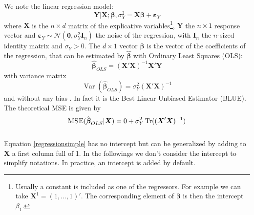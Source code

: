 \documentclass[12pt,a4paper]{report}
\begin{document}
We note the linear regression model:
\begin{equation}
		\boldsymbol{Y}|\boldsymbol{X};\boldsymbol{\beta},\sigma^2_Y=\boldsymbol{X}\boldsymbol{\beta} + \boldsymbol{\varepsilon}_Y \label{regressionsimple}
	\end{equation}
	where $\boldsymbol{X}$ is the $n\times d$ matrix of the explicative variables\footnote{Usually a constant is included as one of the regressors. For example we can take $\boldsymbol{X}^1=(1,\ldots,1)'$. The corresponding element of $\boldsymbol{\beta}$ is then the intercept $\beta_1$.},%
	 $\boldsymbol{Y}$ the  $n\times 1$ response vector and $\boldsymbol{\varepsilon}_Y \sim \mathcal{N}(\boldsymbol{0},\sigma_Y^2\boldsymbol{I}_n)$ the noise of the regression, with $\boldsymbol{I}_n$ the $n$-sized identity matrix and $\sigma_Y >0$. The $d\times 1$ vector $\boldsymbol{\beta}$ is the vector of the coefficients of the regression, that can be estimated by $\hat{\boldsymbol{\beta}}$ with Ordinary Least Squares (\textsc{OLS}): %
	\begin{equation}
		\boldsymbol{\hat{\beta}}_{OLS}=\left(\boldsymbol{X}'\boldsymbol{X} \right) ^{-1}\boldsymbol{X}'\boldsymbol{Y}\label{betaOLS}
	\end{equation}
	with variance matrix
	\begin{equation}
		\operatorname{Var}(\hat{\boldsymbol{\beta}}_{OLS})=\sigma_Y^2\left(\boldsymbol{X}'\boldsymbol{X} \right) ^{-1} \label{eq:varOLS}
	\end{equation}
	and without any bias \cite{saporta2006probabilites,dodge2004analyse}. In fact it is the Best Linear Unbiased Estimator (BLUE).
	The theoretical MSE is given by
	\begin{equation}
	\textsc{MSE}(\hat{\boldsymbol{\beta}}_{OLS}|\boldsymbol{X})= 0 + \sigma_Y^2 \operatorname{Tr}((\boldsymbol{X}'\boldsymbol{X})^{-1})
	\end{equation}
	\\
	Equation \ref{regressionsimple}	has no intercept but can be generalized by adding to $\boldsymbol{X}$ a first column full of 1. In the followings we don't consider the intercept to simplify notations. In practice, an intercept is added by default.\\
	
\end{document}
